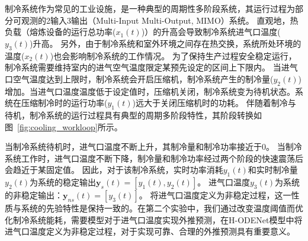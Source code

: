 制冷系统作为常见的工业设施，是一种典型的周期性多阶段系统，其运行过程为部分可观测的2输入3输出（Multi-Input Multi-Output, MIMO）系统。
直观地，热负载（熔炼设备的运行总功率($x_1(t)$)）的升高会导致制冷系统进气口温度($y_3(t)$)升高。
另外，由于制冷系统和室外环境之间存在热交换，系统所处环境的温度($x_2(t)$)也会影响制冷系统的工作情况。
为了保持生产过程安全稳定运行，制冷系统需要维持室内的进气空气温度限定某预先设定的区间上下限内。
当进气口空气温度达到上限时，制冷系统会开启压缩机，制冷系统产生的制冷量($y_2(t)$)增加。当进气口温度温度低于设定值时，压缩机关闭，制冷系统变为待机状态。系统在压缩制冷时的运行功率($y_1(t)$)远大于关闭压缩机时的功耗。
伴随着制冷与待机，制冷系统的运行过程具有典型的周期多阶段特性，其阶段转换如图~\ref{fig:cooling_workloop}所示。 

当制冷系统待机时，进气口温度不断上升，其制冷量和制冷功率接近于0。
当制冷系统工作时，进气口温度不断下降，制冷量和制冷功率经过两个阶段的快速震荡后会趋近于某固定值。
因此，对于该制冷系统，实时功率消耗$y_1(t)$和实时制冷量$y_2(t)$为系统的稳定输出$\boldsymbol y_s(t)=[y_1(t), y_2(t)]$。
进气口温度$y_3(t)$为系统的非稳定输出：$\boldsymbol y_{ns}(t)=[y_3(t)]$。
将进气口温度定义为非稳定过程，这一性质与系统的先验特性是保持一致的。在第二个实验中，我们通过改变温度阈值而优化制冷系统能耗，需要模型对于进气口温度实现外推预测，在H-ODENet模型中将进气口温度定义为非稳定过程，对于实现可靠、合理的外推预测具有重要意义。




